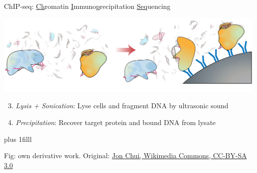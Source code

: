 \documentclass[10pt]{beamer}
\newcommand{\credit}[1]{{\vskip0pt plus 1filll \par \raggedleft \scriptsize \mdseries \color{mDarkBrown} #1 \par}}
\begin{document}
\begin{frame}{ChIP-seq: \underline{Ch}romatin \underline{I}mmuno\underline{p}recipitation \underline{Seq}uencing}
	\vspace{3em}
	\begin{center}
		\includegraphics[width=\textwidth]{./figures/ChIPseq2.png}
	\end{center}
	\begin{minipage}[t]{.49\linewidth}
		\begin{enumerate}
			\setcounter{enumi}{2}
			\item \textit{Lysis + Sonication}: Lyse cells and fragment DNA by ultrasonic sound
		\end{enumerate}
	\end{minipage}
	\begin{minipage}[t]{.49\linewidth}
		\begin{enumerate}
			\setcounter{enumi}{3}
			\item \textit{Precipitation}: Recover target protein and bound DNA from lysate
		\end{enumerate}
	\end{minipage}
	\credit{Fig: own derivative work. Original: \href{http://commons.wikimedia.org/wiki/File:Chromatin\_immunoprecipitation\_sequencing.svg}{Jon Chui, Wikimedia Commons, CC-BY-SA 3.0}}
\end{frame}
\end{document}
